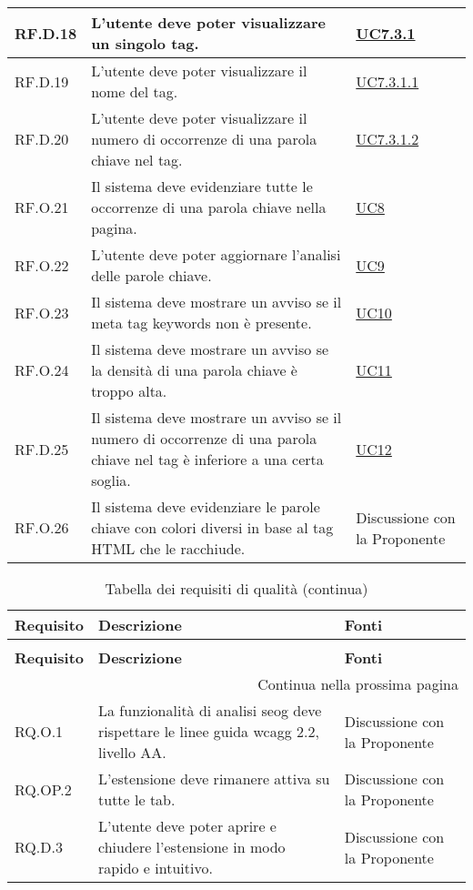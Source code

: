 \begin{longtable}{p{}p{}p{}}
\hline
RF.D.18 & L'utente deve poter visualizzare un singolo tag. & \hyperref[UC7point3point1]{UC7.3.1} \\
\hline
RF.D.19 & L'utente deve poter visualizzare il nome del tag. & \hyperref[UC7point3point1point1]{UC7.3.1.1} \\
\hline
RF.D.20 & L'utente deve poter visualizzare il numero di occorrenze di una parola chiave nel tag. & \hyperref[UC7point3point1point2]{UC7.3.1.2} \\
\hline
RF.O.21 & Il sistema deve evidenziare tutte le occorrenze di una parola chiave nella pagina. & \hyperref[UC8]{UC8} \\
\hline
RF.O.22 & L'utente deve poter aggiornare l'analisi delle parole chiave. & \hyperref[UC9]{UC9} \\
\hline
RF.O.23 & Il sistema deve mostrare un avviso se il meta tag keywords non è presente. & \hyperref[UC10]{UC10} \\
\hline
RF.O.24 & Il sistema deve mostrare un avviso se la densità di una parola chiave è troppo alta. & \hyperref[UC11]{UC11} \\
\hline
RF.D.25 & Il sistema deve mostrare un avviso se il numero di occorrenze di una parola chiave nel tag è inferiore a una certa soglia. & \hyperref[UC12]{UC12} \\
\hline
RF.O.26 & Il sistema deve evidenziare le parole chiave con colori diversi in base al tag HTML che le racchiude. & Discussione con la Proponente \\
\end{longtable}

\newpage

\renewcommand{\arraystretch}{1.5}
\begin{longtable}{p{}p{}p{}}
\caption{Tabella dei requisti di qualità}
\label{tab:requisiti-qualitativi} \\
\hline\hline
\textbf{Requisito} & \textbf{Descrizione} & \textbf{Fonti}\\
\endfirsthead
    
\caption[]{Tabella dei requisiti di qualità (continua)} \\
\hline\hline
\textbf{Requisito} & \textbf{Descrizione} & \textbf{Fonti} \\ 
\endhead
    
\multicolumn{3}{r}{{Continua nella prossima pagina}} \\ 
\endfoot
    
\hline
\endlastfoot

\hline
RQ.O.1 & La funzionalità di analisi \gls{seog} deve rispettare le linee guida \gls{wcagg} 2.2, livello AA. & Discussione con la Proponente \\
\hline
RQ.OP.2 & L'estensione deve rimanere attiva su tutte le tab. & Discussione con la Proponente \\
\hline
RQ.D.3 & L'utente deve poter aprire e chiudere l'estensione in modo rapido e intuitivo. & Discussione con la Proponente \\
\end{longtable}

